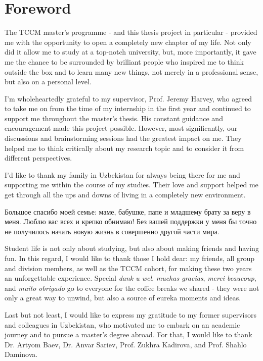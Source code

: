 \chapter*{Foreword}  

The TCCM master's programme - and this thesis project in particular - provided me with the opportunity to open a completely new chapter of my life. Not only did it allow me to study at a top-notch university, but, more importantly, it gave me the chance to be surrounded by brilliant people who inspired me to think outside the box and to learn many new things, not merely in a professional sense, but also on a personal level.

\par\smallskip
I'm wholeheartedly grateful to my supervisor, Prof. Jeremy Harvey, who agreed to take me on from the time of my internship in the first year and continued to support me throughout the master's thesis. His constant guidance and encouragement made this project possible. However, most significantly, our discussions and brainstorming sessions had the greatest impact on me. They helped me to think critically about my research topic and to consider it from different perspectives.

\par\smallskip
I'd like to thank my family in Uzbekistan for always being there for me and supporting me within the course of my studies. Their love and support helped me get through all the ups and downs of living in a completely new environment. \begin{otherlanguage}{russian} Большое спасибо моей семье: маме, бабушке, папе и младшему брату за веру в меня. Люблю вас всех и крепко обнимаю! Без вашей поддержки у меня бы точно не получилось начать новую жизнь в совершенно другой части мира. \end{otherlanguage}

\par\smallskip
Student life is not only about studying, but also about making friends and having fun. In this regard, I would like to thank those I hold dear: my friends, all group and division members, as well as the TCCM cohort, for making these two years an unforgettable experience. Special \textit{dank u wel}, \textit{muchas gracias}, \textit{merci beaucoup}, and \textit{muito obrigado} go to everyone for the coffee breaks we shared - they were not only a great way to unwind, but also a source of eureka moments and ideas.

\par\smallskip
Last but not least, I would like to express my gratitude to my former supervisors and colleagues in Uzbekistan, who motivated me to embark on an academic journey and to pursue a master's degree abroad. For that, I would like to thank Dr. Artyom Baev, Dr. Anvar Sariev, Prof. Zukhra Kadirova, and Prof. Shahlo Daminova. 

